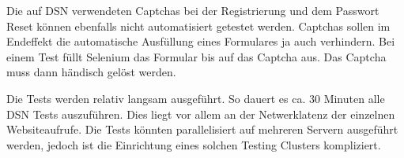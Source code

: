 Die auf DSN verwendeten Captchas bei der Registrierung und dem Passwort Reset können ebenfalls nicht automatisiert getestet werden. Captchas sollen im Endeffekt die automatische Ausfüllung eines Formulares ja auch verhindern. Bei einem Test füllt Selenium das Formular bis auf das Captcha aus. Das Captcha muss dann händisch gelöst werden. 

Die Tests werden relativ langsam ausgeführt. So dauert es ca. 30 Minuten alle DSN Tests auszuführen. Dies liegt vor allem an der Netwerklatenz der einzelnen Websiteaufrufe. Die Tests könnten parallelisiert auf mehreren Servern ausgeführt werden, jedoch ist die Einrichtung eines solchen Testing Clusters kompliziert.
